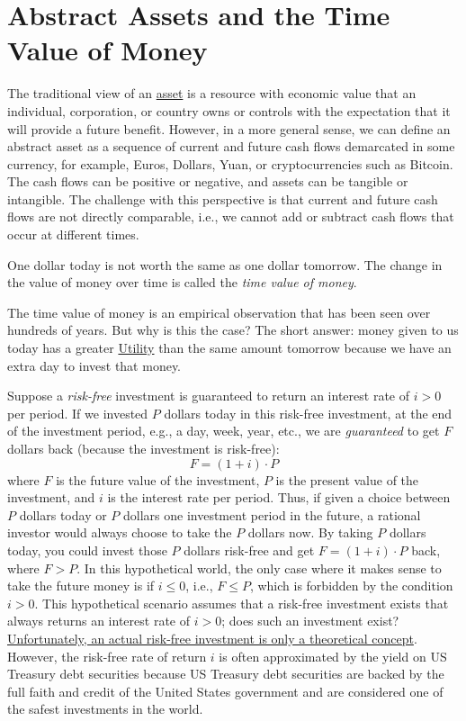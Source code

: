 \documentclass[11pt]{article}
\theoremstyle{definition}
\newcommand{\newterm}[1]{{\it #1}}
\begin{document}
\section*{Abstract Assets and the Time Value of Money}
The traditional view of an \href{https://en.wikipedia.org/wiki/Asset}{asset} is a resource with economic value that an individual, corporation, or country owns or controls with the expectation that it will provide a future benefit.
However, in a more general sense, we can define an abstract asset as a sequence of current and future cash flows demarcated in some currency, for example, Euros, Dollars, Yuan, or cryptocurrencies such as Bitcoin.
The cash flows can be positive or negative, and assets can be tangible or intangible.
The challenge with this perspective is that current and future cash flows are not directly comparable,
i.e., we cannot add or subtract cash flows that occur at different times.

\begin{concept}\label{concept:time-value-of-money}
	One dollar today is not worth the same as one dollar tomorrow. 
	The change in the value of money over time is called the \newterm{time value of money}.
\end{concept}
The time value of money is an empirical observation that has been seen over hundreds of years. 
But why is this the case? The short answer: money given to us today has a greater \href{https://en.wikipedia.org/wiki/Utility}{Utility} 
than the same amount tomorrow because we have an extra day to invest that money.

Suppose a \emph{risk-free} investment is guaranteed to return an interest rate of $i>0$ per period.
If we invested $P$ dollars today in this risk-free investment, at the end of the investment period, e.g., a day, week, year, etc., 
we are \emph{guaranteed} to get $F$ dollars back (because the investment is risk-free):
\begin{equation}
F = (1+i)\cdot{P}
\end{equation}
where $F$ is the future value of the investment, $P$ is the present value of the investment, and $i$ is the interest rate per period.
Thus, if given a choice between $P$ dollars today or $P$ dollars one investment period in the future, 
a rational investor would always choose to take the $P$ dollars now. By taking $P$ dollars today, you could invest those $P$ dollars risk-free and get $F = (1+i)\cdot{P}$ back, where $F>P$. 
In this hypothetical world, the only case where it makes sense to take the future money is if $i\leq{0}$, i.e., $F\leq{P}$, which is forbidden by the condition $i>0$. 
This hypothetical scenario assumes that a risk-free investment exists that always returns an interest rate of $i>0$; 
does such an investment exist? \href{https://www.investopedia.com/terms/r/risk-freerate.asp}{Unfortunately, an actual risk-free investment is only a theoretical concept}. 
However, the risk-free rate of return $i$ is often approximated by the yield on US Treasury debt securities because US Treasury debt securities are backed by the full faith and credit of the United States government
and are considered one of the safest investments in the world.
\end{document}
